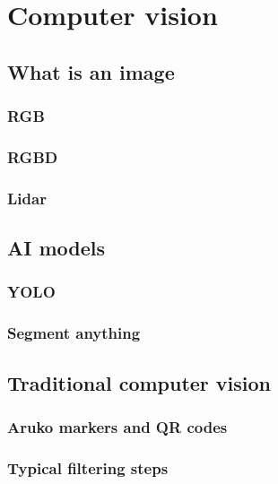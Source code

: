 \chapter{Computer vision}
\section{What is an image}
\subsection{RGB}
\subsection{RGBD}
\subsection{Lidar}

\section{AI models}
\subsection{YOLO}
\subsection{Segment anything}


\section{Traditional computer vision}
\subsection{Aruko markers and QR codes}
\subsection{Typical filtering steps}
